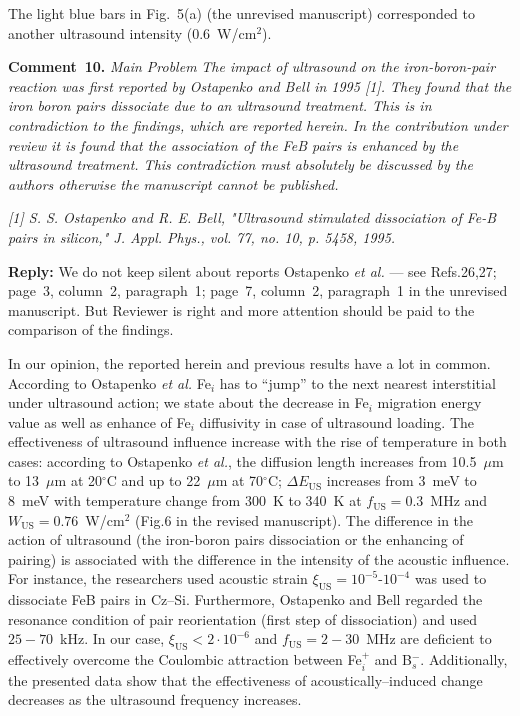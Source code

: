 \documentclass[sn-mathphys]{sn-jnl}
\begin{document}
The light blue bars in Fig.~5(a) (the unrevised manuscript) corresponded to another ultrasound intensity
(0.6~W/cm$^2$).

\vspace{1cm}
\noindent
\textcolor[rgb]{0.00,0.50,1.00}{\textbf{Comment~10.}}
\emph{Main Problem}
\emph{The impact of ultrasound on the iron-boron-pair reaction was first reported by Ostapenko and Bell in 1995 [1]. They found that the iron boron pairs dissociate due to an ultrasound treatment. This is in contradiction to the findings, which are reported herein. In the contribution under review it is found that the association of the FeB pairs is enhanced by the ultrasound treatment. This contradiction must absolutely be discussed by the authors otherwise the manuscript cannot be published.}

\emph{
[1] S. S. Ostapenko and R. E. Bell, "Ultrasound stimulated dissociation of Fe-B pairs in silicon," J. Appl. Phys., vol. 77, no. 10, p. 5458, 1995.
 }

\noindent
\textcolor[rgb]{0.51,0.00,0.00}{\textbf{Reply:}}
We do not keep silent about reports Ostapenko \emph{et al.} --- see Refs.26,27;
page~3, column~2, paragraph~1; page~7, column~2, paragraph~1 in the unrevised manuscript.
But Reviewer is right and more attention should be paid to the comparison of the findings.

In our opinion,
the reported herein and previous results have a lot in common.
According to Ostapenko \emph{et al.}\cite{Ostapenko1995SST}
Fe$_i$ has to ``jump'' to the next nearest interstitial under ultrasound action;
we state about the decrease in Fe$_i$ migration energy value
as well as enhance of Fe$_i$ diffusivity
in case of ultrasound loading.
The effectiveness of ultrasound influence increase with the rise of temperature in both cases:
according to Ostapenko \emph{et al.},\cite{Ostapenko1994APL,Ostapenko1995SST}
the diffusion length increases from 10.5~$\mu$m to 13~$\mu$m at 20$^\circ$C and up to
22~$\mu$m at 70$^\circ$C;
$\Delta E_\mathrm{US}$ increases from 3~meV to 8~meV with temperature change
from 300~K to 340~K at  $f_\mathrm{US}=0.3$~MHz and $W_\mathrm{US}=0.76$~W/cm$^2$
(Fig.6 in the revised manuscript).
The difference in the action of ultrasound
(the iron-boron pairs dissociation or the enhancing of pairing)
is associated with the difference in the intensity of the acoustic influence.
For instance, the researchers used acoustic strain $\xi_\mathrm{US}=10^{-5}$-$10^{-4}$
was used\cite{Ostapenko1995}
to dissociate FeB pairs in Cz--Si.
Furthermore,
Ostapenko and Bell\cite{Ostapenko1995} regarded the resonance condition of
pair reorientation (first step of dissociation) and used $25-70$~kHz.
In our case,  $\xi_\mathrm{US}<2\cdot10^{-6}$ and $f_\mathrm{US}=2-30$~MHz are deficient to effectively overcome the Coulombic attraction between Fe$_i^+$ and B$_s^-$.
Additionally, the presented data show that the effectiveness of acoustically--induced change
decreases as the ultrasound frequency increases.
\end{document}
